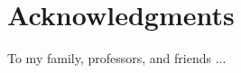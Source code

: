 \documentclass[english,10pt,a4paper,titlepage]{report}
\begin{document}


\chapter*{Acknowledgments}
To my family, professors, and friends ...

\tableofcontents
\listoftables
\listoffigures







\appendix




\end{document}
